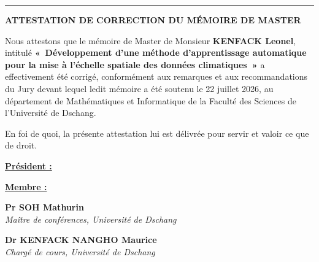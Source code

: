 \vspace{0.5em}
\noindent\rule{\linewidth}{0.6pt}

\vspace{2em}

{\bfseries\fontsize{14pt}{18pt}\selectfont ATTESTATION DE CORRECTION DU MÉMOIRE DE MASTER \par}

\vspace{1.5em}

\begin{SingleSpace}
\begin{flushleft}
\setlength{\parindent}{0.6cm}

\hspace{0.6cm}Nous attestons que le mémoire de Master de Monsieur \textbf{KENFACK Leonel}, intitulé \textbf{«~Développement d'une méthode d'apprentissage automatique pour la mise à l'échelle spatiale des données climatiques~»} a effectivement été corrigé, conformément aux remarques et aux recommandations du Jury devant lequel ledit mémoire a été soutenu le 22 juillet 2026, au département de Mathématiques et Informatique de la Faculté des Sciences de l'Université de Dschang.

\vspace{0.8em}

\hspace{0.6cm}En foi de quoi, la présente attestation lui est délivrée pour servir et valoir ce que de droit.

\end{flushleft}
\end{SingleSpace}

\vspace{1.5em}

\noindent
\begin{minipage}[t]{0.47\linewidth}
\raggedright \underline{\textbf{Président :}}
\end{minipage}%
\hfill
\begin{minipage}[t]{0.47\linewidth}
\raggedright \underline{\textbf{Membre :}}
\end{minipage}

\vspace{5.5em}

\noindent
\begin{minipage}[t]{0.47\linewidth}
\raggedright \textbf{Pr SOH Mathurin}\\[0.15em]
{\itshape\small Maître de conférences, Université de Dschang}
\end{minipage}%
\hfill
\begin{minipage}[t]{0.47\linewidth}
\raggedright \textbf{Dr KENFACK NANGHO Maurice}\\[0.15em]
{\itshape\small Chargé de cours, Université de Dschang}
\end{minipage}


